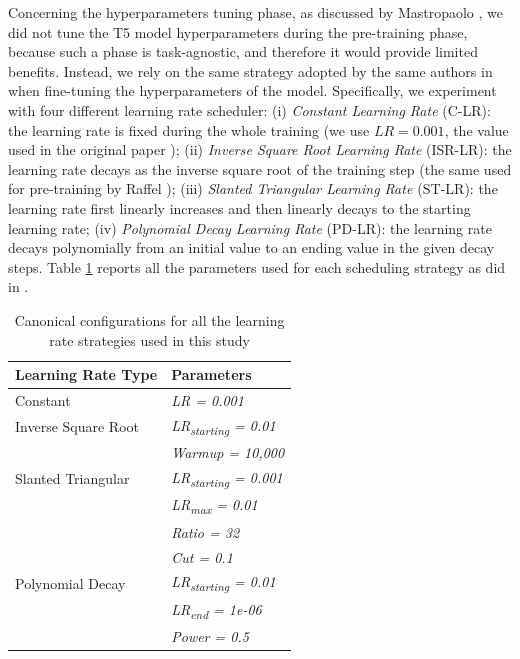 Concerning the hyperparameters tuning phase, as discussed by Mastropaolo \etal \cite{mastropaolo2021studying}, we did not tune the T5 model hyperparameters during the pre-training phase, because such a phase is task-agnostic, and therefore it would provide limited benefits. Instead, we rely on the same strategy adopted by the same authors in \cite{mastropaolo2022using} when fine-tuning the hyperparameters of the model. Specifically, we experiment with four different learning rate scheduler: (i) \textit{Constant Learning Rate} (C-LR): the learning rate is fixed during the whole training (we use $LR = 0.001$, \ie the value used in the original paper \cite{raffel2019exploring}); (ii) \textit{Inverse Square Root Learning Rate} (ISR-LR): the learning rate decays as the inverse square root of the training step (the same used for pre-training by Raffel \etal); (iii) \textit{Slanted Triangular Learning Rate \cite{howard2018universal}} (ST-LR): the learning rate first linearly increases and then linearly decays to the starting learning rate;  (iv) \textit{Polynomial Decay Learning Rate} (PD-LR): the learning rate decays polynomially from an initial value to an ending value in the given decay steps. Table \ref{tab:learning-rates} reports all the parameters used for each scheduling strategy as did in \cite{mastropaolo2022using}.

\begin{table}[h]
	\centering
	\begin{tabular}{ll}
		\hline
		\textbf{Learning Rate Type} & \textbf{Parameters}               \\ \hline
		Constant                     & \textit{LR = 0.001}               \\
		Inverse Square Root         & \textit{LR\textsubscript{starting} = 0.01}  \\
		& \textit{Warmup = 10,000}          \\
		Slanted Triangular          & \textit{LR\textsubscript{starting} = 0.001} \\
		& \textit{LR\textsubscript{max} = 0.01}       \\
		& \textit{Ratio = 32}               \\
		& \textit{Cut = 0.1}                \\
		Polynomial Decay            & \textit{LR\textsubscript{starting} = 0.01}  \\
		& \textit{LR\textsubscript{end} = 1e-06}      \\
		& \textit{Power = 0.5}              \\ \hline
	\end{tabular}
	\vspace{0.2cm}
	\caption{Canonical configurations for all the learning rate strategies used in this study}
	\label{tab:learning-rates}
\end{table}

